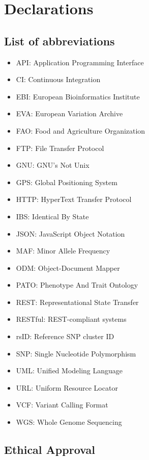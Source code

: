 \documentclass[a4paper,num-refs,gigabyte]{oup-contemporary}
\begin{document}
\section{Declarations}

\subsection{List of abbreviations}

\begin{itemize}
\item API: Application Programming Interface
\item CI: Continuous Integration
\item EBI: European Bioinformatics Institute
\item EVA: European Variation Archive
\item FAO: Food and Agriculture Organization
\item FTP: File Transfer Protocol
\item GNU: GNU's Not Unix
\item GPS: Global Positioning System
\item HTTP: HyperText Transfer Protocol
\item IBS: Identical By State
\item JSON: JavaScript Object Notation
\item MAF: Minor Allele Frequency
\item ODM: Object-Document Mapper
\item PATO: Phenotype And Trait Ontology
\item REST: Representational State Transfer
\item RESTful: REST-compliant systems
\item rsID: Reference SNP cluster ID
\item SNP: Single Nucleotide Polymorphism
\item UML: Unified Modeling Language
\item URL: Uniform Resource Locator
\item VCF: Variant Calling Format
\item WGS: Whole Genome Sequencing
\end{itemize}

\subsection{Ethical Approval}
\end{document}
